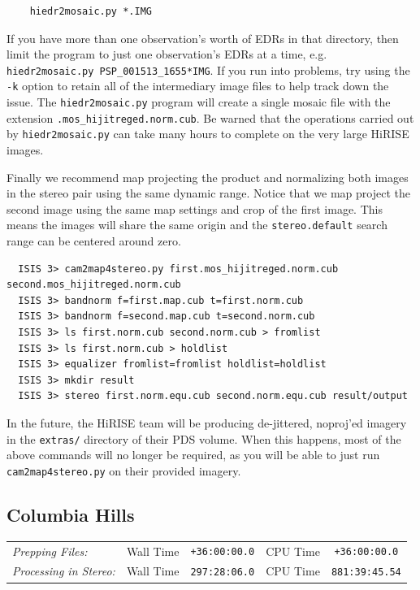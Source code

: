 \begin{verbatim}
    hiedr2mosaic.py *.IMG
\end{verbatim}

If you have more than one observation's worth of EDRs in that
directory, then limit the program to just one observation's EDRs
at a time, e.g. \texttt{hiedr2mosaic.py PSP\_001513\_1655*IMG}.  If you
run into problems, try using the \texttt{-k} option to retain all of 
the intermediary image files to help track down the issue.  The
\texttt{hiedr2mosaic.py} program will create a single mosaic file 
with the extension \texttt{.mos\_hijitreged.norm.cub}.  Be warned that
the operations carried out by \texttt{hiedr2mosaic.py} can take many 
hours to complete on the very large HiRISE images.

Finally we recommend map projecting the product and normalizing both
images in the stereo pair using the same dynamic range. Notice that we
map project the second image using the same map settings and crop of
the first image. This means the images will share the same origin and
the {\tt stereo.default} search range can be centered around zero.

\begin{verbatim}
  ISIS 3> cam2map4stereo.py first.mos_hijitreged.norm.cub second.mos_hijitreged.norm.cub 
  ISIS 3> bandnorm f=first.map.cub t=first.norm.cub
  ISIS 3> bandnorm f=second.map.cub t=second.norm.cub
  ISIS 3> ls first.norm.cub second.norm.cub > fromlist
  ISIS 3> ls first.norm.cub > holdlist
  ISIS 3> equalizer fromlist=fromlist holdlist=holdlist
  ISIS 3> mkdir result
  ISIS 3> stereo first.norm.equ.cub second.norm.equ.cub result/output
\end{verbatim}

In the future, the HiRISE team will be producing de-jittered, noproj'ed
imagery in the \texttt{extras/} directory of their \ac{PDS} volume.
When this happens, most of the above commands will no longer be required,
as you will be able to just run \texttt{cam2map4stereo.py} on their provided imagery.

\subsection{Columbia Hills}

\begin{tabular}{ l r c r c}
\textit{Prepping Files:}       & Wall Time & \texttt{+36:00:00.0} & CPU Time & \texttt{+36:00:00.0} \\
\textit{Processing in Stereo:} & Wall Time & \texttt{297:28:06.0} & CPU Time & \texttt{881:39:45.54} \\
\end{tabular}

